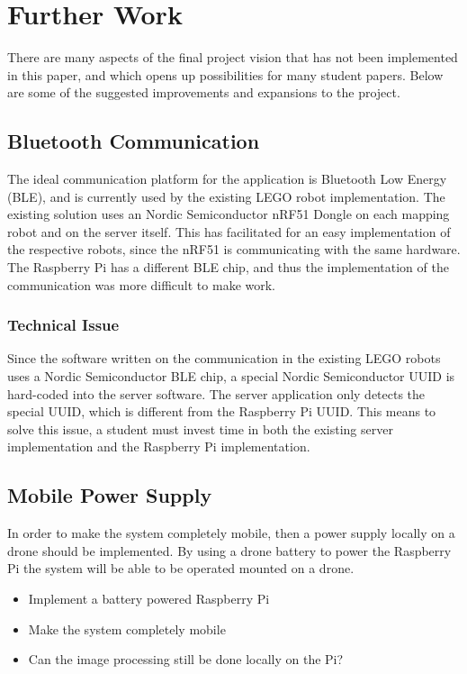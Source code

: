 \section{Further Work}
There are many aspects of the final project vision that has not been implemented in this paper, and which opens up possibilities for many student papers. Below are some of the suggested improvements and expansions to the project.


\subsection{Bluetooth Communication}
The ideal communication platform for the application is Bluetooth Low Energy (BLE), and is currently used by the existing LEGO robot implementation. The existing solution uses an Nordic Semiconductor nRF51 Dongle\cite{nrf51} on each mapping robot and on the server itself. This has facilitated for an easy implementation of the respective robots, since the nRF51 is communicating with the same hardware. The Raspberry Pi has a different BLE chip, and thus the implementation of the communication was more difficult to make work.

\subsubsection{Technical Issue}
Since the software written on the communication in the existing LEGO robots uses a Nordic Semiconductor BLE chip, a special Nordic Semiconductor UUID is hard-coded into the server software. The server application only detects the special UUID, which is different from the Raspberry Pi UUID. This means to solve this issue, a student must invest time in both the existing server implementation and the Raspberry Pi implementation. 

\subsection{Mobile Power Supply}
In order to make the system completely mobile, then a power supply locally on a drone should be implemented. By using a drone battery to power the Raspberry Pi the system will be able to be operated mounted on a drone. 
\begin{itemize}
\item Implement a battery powered Raspberry Pi
\item Make the system completely mobile
\item Can the image processing still be done locally on the Pi?
\end{itemize}

